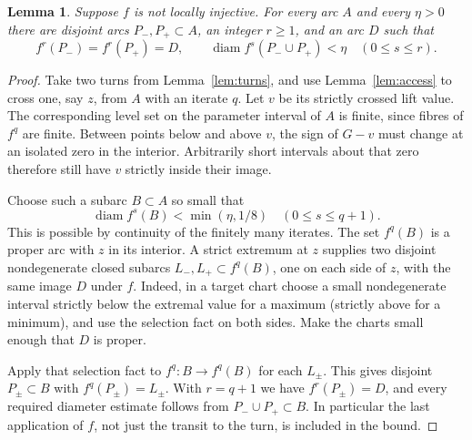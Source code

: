 \documentclass[11pt]{article}
\newtheorem{lemma}[theorem]{Lemma}
\newcommand{\diam}{\operatorname{diam}}
\begin{document}
\begin{lemma}\label{lem:branch}
Suppose $f$ is not locally injective. For every arc $A$ and every $\eta>0$ there are disjoint arcs $P_-,P_+\subset A$, an integer $r\ge1$, and an arc $D$ such that
\[
 f^r(P_-)=f^r(P_+)=D,\qquad
 \diam f^s(P_-\cup P_+)<\eta\quad(0\le s\le r).
\]
\end{lemma}
\begin{proof}
Take two turns from Lemma~\ref{lem:turns}, and use Lemma~\ref{lem:access} to cross one, say $z$, from $A$ with an iterate $q$. Let $v$ be its strictly crossed lift value. The corresponding level set on the parameter interval of $A$ is finite, since fibres of $f^q$ are finite. Between points below and above $v$, the sign of $G-v$ must change at an isolated zero in the interior. Arbitrarily short intervals about that zero therefore still have $v$ strictly inside their image.

Choose such a subarc $B\subset A$ so small that
\[
 \diam f^s(B)<\min(\eta,1/8)\quad(0\le s\le q+1).
\]
This is possible by continuity of the finitely many iterates. The set $f^q(B)$ is a proper arc with $z$ in its interior. A strict extremum at $z$ supplies two disjoint nondegenerate closed subarcs $L_-,L_+\subset f^q(B)$, one on each side of $z$, with the same image $D$ under $f$. Indeed, in a target chart choose a small nondegenerate interval strictly below the extremal value for a maximum (strictly above for a minimum), and use the selection fact on both sides. Make the charts small enough that $D$ is proper.

Apply that selection fact to $f^q:B\to f^q(B)$ for each $L_\pm$. This gives disjoint $P_\pm\subset B$ with $f^q(P_\pm)=L_\pm$. With $r=q+1$ we have $f^r(P_\pm)=D$, and every required diameter estimate follows from $P_-\cup P_+\subset B$. In particular the last application of $f$, not just the transit to the turn, is included in the bound.
\end{proof}
\end{document}
